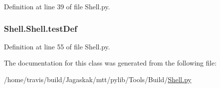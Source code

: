 Definition at line 39 of file Shell.\-py.

\hypertarget{classShell_1_1Shell_ac2533422279cd3b3d3bc43e8b3de1301}{
\subsubsection[{test\-Def}]{\setlength{\rightskip}{0pt plus 5cm}Shell.\-Shell.\-test\-Def}}\label{classShell_1_1Shell_ac2533422279cd3b3d3bc43e8b3de1301}


Definition at line 55 of file Shell.\-py.



The documentation for this class was generated from the following file\-:\begin{DoxyCompactItemize}
\item 
/home/travis/build/\-Jagaskak/mtt/pylib/\-Tools/\-Build/\hyperlink{Shell_8py}{Shell.\-py}\end{DoxyCompactItemize}
